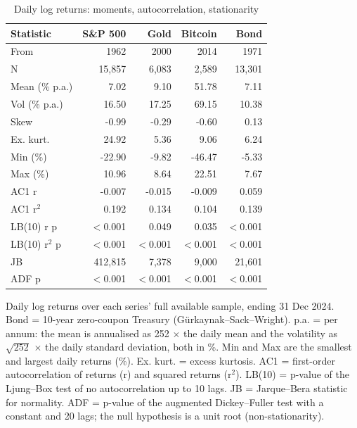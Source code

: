 \begin{table}[t]
\centering
\scriptsize
\caption{Daily log returns: moments, autocorrelation, stationarity}
\label{tab:tab_series_stats}
\begin{tabular}{lrrrr}
\toprule
Statistic & S\&P 500 & Gold & Bitcoin & Bond \\
\midrule
From & 1962 & 2000 & 2014 & 1971 \\
N & 15,857 & 6,083 & 2,589 & 13,301 \\
Mean (\% p.a.) & 7.02 & 9.10 & 51.78 & 7.11 \\
Vol (\% p.a.) & 16.50 & 17.25 & 69.15 & 10.38 \\
Skew & -0.99 & -0.29 & -0.60 & 0.13 \\
Ex. kurt. & 24.92 & 5.36 & 9.06 & 6.24 \\
Min (\%) & -22.90 & -9.82 & -46.47 & -5.33 \\
Max (\%) & 10.96 & 8.64 & 22.51 & 7.67 \\
AC1 r & -0.007 & -0.015 & -0.009 & 0.059 \\
AC1 r$^2$ & 0.192 & 0.134 & 0.104 & 0.139 \\
LB(10) r p & $<$0.001 & 0.049 & 0.035 & $<$0.001 \\
LB(10) r$^2$ p & $<$0.001 & $<$0.001 & $<$0.001 & $<$0.001 \\
JB & 412,815 & 7,378 & 9,000 & 21,601 \\
ADF p & $<$0.001 & $<$0.001 & $<$0.001 & $<$0.001 \\
\bottomrule
\end{tabular}
\par\smallskip
\parbox{\linewidth}{\footnotesize Daily log returns over each series' full available sample, ending 31 Dec 2024. Bond = 10-year zero-coupon Treasury (G\"urkaynak--Sack--Wright). p.a. = per annum: the mean is annualised as 252 $\times$ the daily mean and the volatility as $\sqrt{252}$ $\times$ the daily standard deviation, both in \%. Min and Max are the smallest and largest daily returns (\%). Ex. kurt. = excess kurtosis. AC1 = first-order autocorrelation of returns (r) and squared returns (r$^2$). LB(10) = p-value of the Ljung--Box test of no autocorrelation up to 10 lags. JB = Jarque--Bera statistic for normality. ADF = p-value of the augmented Dickey--Fuller test with a constant and 20 lags; the null hypothesis is a unit root (non-stationarity).}
\end{table}
